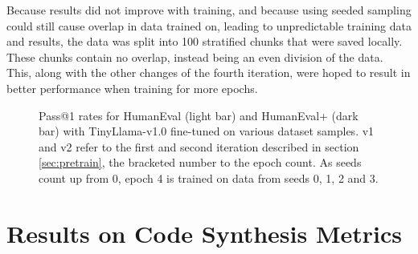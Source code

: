 Because results did not improve with training, and because using seeded sampling could still cause overlap in data trained on, leading to unpredictable training data and results, the data was split into 100 stratified chunks that were saved locally.
These chunks contain no overlap, instead being an even division of the data.
This, along with the other changes of the fourth iteration, were hoped to result in better performance when training for more epochs.

\begin{figure}[H]
    \centering
    \caption{Pass@1 rates for HumanEval (light bar) and HumanEval+ (dark bar) with TinyLlama-v1.0 fine-tuned on various dataset samples. v1 and v2 refer to the first and second iteration described in section \ref{sec:pretrain}, the bracketed number to the epoch count. As seeds count up from 0, epoch 4 is trained on data from seeds 0, 1, 2 and 3.}
    \label{fig:pretrainthree}
\end{figure}


\section{Results on Code Synthesis Metrics}
\label{sec:metricresults}

